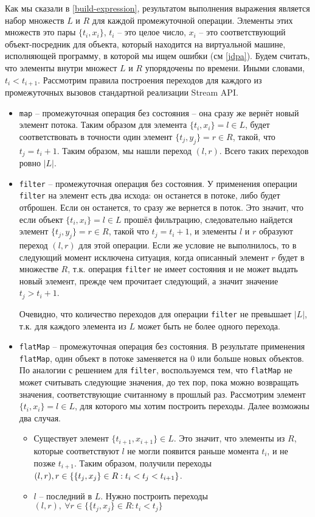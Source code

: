 Как мы сказали в \ref{build-expression}, результатом выполнения выражения является набор множеств $L$ и $R$ для каждой промежуточной операции. Элементы этих множеств это пары $\{t_i, x_i\}$, $t_i$ -- это целое число, $x_i$ -- это соответствующий объект-посредник для объекта, который находится на виртуальной машине, исполняющей программу, в которой мы ищем ошибки (см \ref{jdpa}). Будем считать, что элементы внутри множест $L$ и $R$ упорядочены по времени. Иными словами, $t_i < t_{i + 1}$. Рассмотрим правила построения переходов для каждого из промежуточных вызовов стандартной реализации Stream API.
\begin{itemize}
	\item \texttt{map} -- промежуточная операция без состояния -- она сразу же вернёт новый элемент потока. Таким образом для элемента $\{t_i, x_i\} = l \in L$, будет соответствовать в точности один элемент $\{t_j, y_j\} = r \in R$, такой, что $t_j = t_i + 1$. Таким образом, мы нашли переход $(l, r)$. Всего таких переходов ровно $|L|$.
	\item \texttt{filter} -- промежуточная операция без состояния. У применения операции \texttt{filter} на элемент есть два исхода: он останется в потоке, либо будет отброшен. Если он останется, то сразу же вернется в поток. Это значит, что если объект $\{t_i, x_i\} = l \in L$ прошёл фильтрацию, следовательно найдется элемент $\{t_j, y_j\} = r \in R$, такой что $t_j = t_i + 1$, и элементы $l$ и $r$ образуют переход $(l, r)$ для этой операции. Если же условие не выполнилось, то в следующий момент исключена ситуация, когда описанный элемент $r$ будет в множестве $R$, т.к. операция \texttt{filter} не имеет состояния и не может выдать новый элемент, прежде чем прочитает следующий, а значит значение $t_j > t_i + 1$. 
	
	Очевидно, что количество переходов для операции \texttt{filter} не превышает $|L|$, т.к. для каждого элемента из $L$ может быть не более одного перехода.
	\item \texttt{flatMap} -- промежуточная операция без состояния. В результате применения \texttt{flatMap}, один объект в потоке заменяется на 0 или больше новых объектов. По аналогии с решением для \texttt{filter}, воспользуемся тем, что \texttt{flatMap} не может считывать следующие значения, до тех пор, пока можно возвращать значения, соответствующие считанному в прошлый раз. Рассмотрим элемент $\{t_i, x_i\} = l \in L$, для которого мы хотим построить переходы. Далее возможны два случая.
	\begin{itemize}
		\item Существует элемент $\{t_{i + 1}, x_{i + 1}\} \in L$. Это значит, что элементы из $R$, которые соответствуют $l$ не могли появится раньше момента $t_i$, и не позже $t_{i + 1}$. Таким образом, получили переходы $(l, r), \\ r \in \{\{t_j, x_j\} \in R : t_i < t_j < t_{i + 1}\}$.
		\item $l $ -- последний в $L$. Нужно построить переходы $(l, r), \ \forall r \in \{\{t_j, x_j\} \in R : t_i < t_j\}$
	\end{itemize}


\end{itemize}

